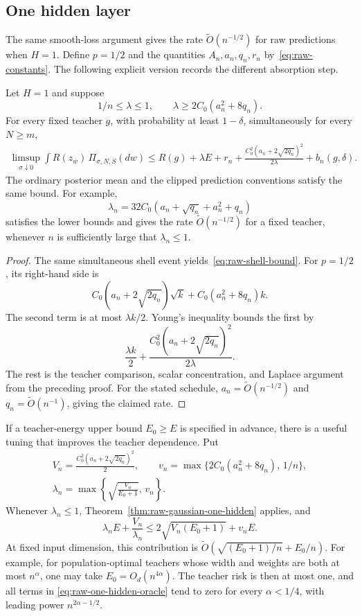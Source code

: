 \subsection{One hidden layer}

The same smooth-loss argument gives the rate $\widetilde O(n^{-1/2})$
for raw predictions when $H=1$.  Define $p=1/2$ and the quantities
$A_n,a_n,q_n,r_n$ by~\eqref{eq:raw-constants}.  The following explicit
version records the different absorption step.

\begin{theorem}
\label{thm:raw-gaussian-one-hidden}
Let $H=1$ and suppose
\[
 1/n\leq\lambda\leq1,
 \qquad \lambda\geq2C_0(a_n^2+8q_n).
\]
For every fixed teacher $g$, with probability at least $1-\delta$,
simultaneously for every $N\geq m$,
\begin{align}
 \limsup_{\sigma\downarrow0}\int R(z_w)\,\Pi_{\sigma,N,S}(dw)
 \leq R(g)+\lambda E+r_n
       +\frac{C_0^2(a_n+2\sqrt{2q_n})^2}{2\lambda}
       +b_n(g,\delta).
 \label{eq:raw-one-hidden-oracle}
\end{align}
The ordinary posterior mean and the clipped prediction conventions
satisfy the same bound.  For example,
\[
 \lambda_n=32C_0(a_n+\sqrt{q_n}+a_n^2+q_n)
\]
satisfies the lower bounds and gives the rate
$\widetilde O(n^{-1/2})$ for a fixed teacher, whenever $n$ is sufficiently
large that $\lambda_n\leq1$.
\end{theorem}
\begin{proof}
The same simultaneous shell event yields~\eqref{eq:raw-shell-bound}.
For $p=1/2$, its right-hand side is
\[
 C_0(a_n+2\sqrt{2q_n})\sqrt k+C_0(a_n^2+8q_n)k.
\]
The second term is at most $\lambda k/2$.  Young's inequality bounds
the first by
\[
 \frac{\lambda k}2+
       \frac{C_0^2(a_n+2\sqrt{2q_n})^2}{2\lambda}.
\]
The rest is the teacher comparison, scalar concentration, and Laplace
argument from the preceding proof.  For the stated schedule,
$a_n=\widetilde O(n^{-1/2})$ and
$q_n=\widetilde O(n^{-1})$, giving the claimed rate.
\end{proof}

If a teacher-energy upper bound $E_0\geq E$ is specified in advance,
there is a useful tuning that improves the teacher dependence.  Put
\begin{gather*}
 V_n=\frac{C_0^2(a_n+2\sqrt{2q_n})^2}{2},\qquad
 v_n=\max\{2C_0(a_n^2+8q_n),\,1/n\},\\
 \lambda_n=\max\left\{\sqrt{\frac{V_n}{E_0+1}},\,v_n\right\}.
\end{gather*}
Whenever $\lambda_n\leq1$, Theorem~\ref{thm:raw-gaussian-one-hidden}
applies, and
\[
 \lambda_n E+\frac{V_n}{\lambda_n}
   \leq2\sqrt{V_n(E_0+1)}+v_nE.
\]
At fixed input dimension, this contribution is
$\widetilde O(\sqrt{(E_0+1)/n}+E_0/n)$.
For example, for population-optimal teachers whose width and weights
are both at most $n^\alpha$, one may take $E_0=O_d(n^{4\alpha})$.
The teacher risk is then at most one, and all terms in
\eqref{eq:raw-one-hidden-oracle} tend to zero for every $\alpha<1/4$,
with leading power $n^{2\alpha-1/2}$.
